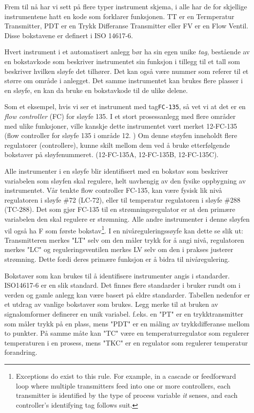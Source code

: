 \documentclass[10pt,a5paper]{article}
\begin{document}
Frem til nå har vi sett på flere typer instrument skjema, i alle har de for skjellige instrumentene hatt en kode som forklarer funksjonen. TT er en Termperatur Transmitter, PDT er en Trykk Differanse Transmitter eller FV er en Flow Ventil. Disse bokstavene er definert i ISO 14617-6. 

Hvert instrument i et automatisert anlegg bør ha sin egen unike \textit{tag}, bestående av en bokstavkode som beskriver instrumentet sin funksjon i tillegg til et tall som beskriver hvilken sløyfe det tilhører. Det kan også være nummer som referer til et større om område i anlegget. Det samme instrumentet kan brukes flere plasser i en sløyfe, en kan da bruke en bokstavkode til de ulike delene.  

Som et eksempel, hvis vi ser et instrument med tag\texttt{FC-135}, så vet vi at det er en \textit{flow controller} (FC) for sløyfe 135. I et stort prosessanlegg med flere områder med ulike funksjoner, ville kanskje dette instrumentet vært merket 12-FC-135 (flow controller for sløyfe 135 i område 12. ) Om denne støyfen inneholdt flere regulatorer (controllere), kunne skilt mellom dem ved å bruke etterfølgende bokstaver på sløyfenummeret. (12-FC-135A, 12-FC-135B, 12-FC-135C). 

Alle instrumenter i en sløyfe blir identifisert med en bokstav som beskriver variabelen som sløyfen skal regulere, helt uavhengig av den fysike oppbygning av instrumentet. Vår tenkte flow controller FC-135, kan være fysisk lik nivå regulatoren i sløyfe \#72 (LC-72), eller til temperatur regulatoren i sløyfe \#288 (TC-288). Det som gjør FC-135 til en strømningsregulator er at den primære variabelen den skal regulere er strømning. Alle andre instrumenter i denne sløyfen vil også ha F som første bokstav\footnote{Exceptions do exist to this rule.  For example, in a cascade or feedforward loop where multiple transmitters feed into one or more controllers, each transmitter is identified by the type of process variable \textit{it} senses, and each controller's identifying tag follows suit.}. I en nivåreguleringssøyfe kan dette se slik ut: Transmitteren merkes "LT" selv om den måler trykk for å angi nivå, regulatoren merkes "LC" og reguleringsventilen merkes LV selv om den i prakses justerer strømning. Dette fordi deres primære funksjon er å bidra til nivåregulering. 

\filbreak

Bokstaver som kan brukes til å identifisere instrumenter angis i standarder. ISO14617-6 er en slik standard. Det finnes flere standarder i bruker rundt om i verden og gamle anlegg kan være basert på eldre standarder. Tabellen nedenfor er et utdrag av vanlige bokstaver som brukes. Legg merke til at bruken av signalomformer definerer en unik variabel. f.eks. en "PT" er en trykktransmitter som måler trykk på en plass, mens "PDT" er en måling av trykkdifferanse mellom to punkter. På samme måte kan "TC" være en temperaturregulator som regulerer temperaturen i en prosess, mens "TKC" er en regulator som regulerer temperatur forandring. 
\end{document}
